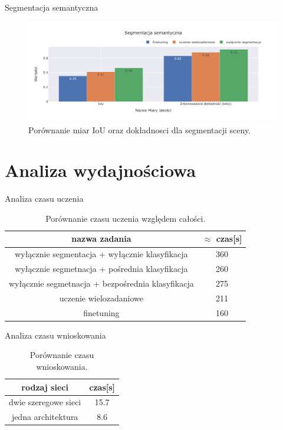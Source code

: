 \documentclass[10pt]{beamer}
\begin{document}
\begin{frame}{Segmentacja semantyczna}
    
    \begin{figure}[ht!]
        \centering
        \includegraphics[width=\textwidth]{images/pl-res/Segmentacja-semantyczna.jpeg}
        \caption{Porównanie miar IoU oraz dokładnosci dla segmentacji sceny.}
        \label{fig:macro-segmentation}
    \end{figure}
\end{frame}
\section*{Analiza wydajnościowa}
\begin{frame}{Analiza czasu uczenia}
    \begin{table}[ht!]
        \centering
        \begin{tabular}{c|c}
            nazwa zadania                      &   $\approx$ czas{[}s{]} \\ \hline
            wyłącznie segmentacja +  wyłącznie klasyfikacja &  360 \\
            wyłącznie segmetnacja + pośrednia klasyfikacja &  260 \\
            wyłącznie segmetnacja + bezpośrednia klasyfikacja &  275 \\
            uczenie wielozadaniowe                   &    211 \\
            finetuning                        &    160 
    \end{tabular}
    \caption{Porównanie czasu uczenia względem całości.}
    \label{tab:por-trening-all}
    \end{table}
\end{frame}

\begin{frame}{Analiza czasu wnioskowania}
    
    \begin{table}[ht!]
        \centering
        \begin{tabular}{c|c}
            rodzaj sieci                      &   czas{[}s{]} \\ \hline
            dwie szeregowe sieci                  &   15.7\\
            jedna architektura               &   8.6
    \end{tabular}
    \caption{Porównanie czasu wnioskowania.}
    \label{tab:por-infer}
    \end{table}
\end{frame}
\end{document}
